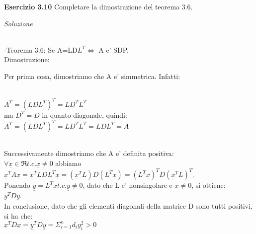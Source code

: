 \documentclass[20pt,a4paper]{book}
\begin{document}
\begin{mah}
\vspace{10mm}

\textbf{\Large{Esercizio 3.10}}
Completare la dimostrazione del teorema 3.6.

\textit{Soluzione}

\\-Teorema 3.6: Se A=LD\begin{math}L^{T}\Leftrightarrow \end{math} A e' SDP.
\\Dimostrazione:
\vspace{5mm}

Per prima cosa, dimostriamo che A e' simmetrica. Infatti:

\\ \begin{math} A^{T}=(LDL^{T})^{T}=LD^{T}L^{T}\end{math}
\\ma \begin{math} D^{T}=D\end{math} in quanto diagonale, quindi:
\\ \begin{math} A^{T}=(LDL^{T})^{T}=LD^{T}L^{T}=LDL^{T}=A\end{math}

\vspace{5mm}

\\Successivamente dimostriamo che A e' definita positiva:
\\ \begin{math} \forall \underline{x}\in\Re t.c. \underline{x}\neq 0 \end{math} abbiamo \begin{math}   \underline{x}^{T}A\underline{x}=\underline{x}^{T}LDL^{T}\underline{x}=(\underline{x}^{T}L)D(L^{T}\underline{x})=(L^{T}\underline{x})^{T}D(\underline{x}^{T}L)^{T}\end{math}.
\\Ponendo \begin{math} \underline{y}=L^{T}\underline{x} t.c. \underline{y}\neq 0\end{math}, dato che L e' nonsingolare e \begin{math} \underline{x}\neq 0 \end{math}, si ottiene:
\\ \begin{math} \underline{y}^{T}D\underline{y}\end{math}.
\\In conclusione, dato che gli elementi diagonali della matrice D sono tutti positivi, si ha che:
\\\begin{math} \underline{x}^{T}D\underline{x}=\underline{y}^{T}D\underline{y}=\Sigma_{i=1}^{n}d_{i}y_{i}^{2}>0\end{math}




\end{mah}
\end{document}
